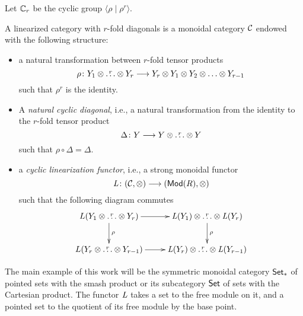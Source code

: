 Let $\mathbb{C}_r$ be the cyclic group $\langle\rho\mid \rho^r\rangle$.
\begin{definition}
	A linearized category with $r$-fold diagonals is a monoidal category $\mathcal{C}$ %
	endowed with the following structure:
	\begin{itemize}
		\item a natural transformation between $r$-fold tensor products
		\[
		\rho \colon Y_1 \ot \overset{r}{\dots} \ot Y_r \lra Y_r \ot Y_1 \ot Y_2 \ot \dots \ot Y_{r-1}
		\]
		such that $\rho^r$ is the identity.
		\item A \emph{natural cyclic diagonal}, i.e., a natural transformation from the identity to the $r$-fold tensor product
		\[
		\Delta \colon Y \longrightarrow Y \otimes \overset{r}{\dots} \otimes Y
		\]
		such that $\rho\circ \Delta = \Delta$.
		\item a \emph{cyclic linearization functor}, i.e., a %
		strong monoidal functor
		\[
		\operatorname{{\it L}} \colon (\mathcal{C}, \otimes ) \longrightarrow (\mathsf{Mod}(R), \otimes )
		\]
		such that the following diagram commutes
		\[
		\xymatrix{
			L(Y_1 \ot \overset{r}{\dots} \ot Y_r) \ar[r]\ar[d]^{\rho} & \abel(Y_1) \ot \overset{r}{\dots} \ot 	\abel(Y_r)\ar[d]^{\rho} \\
			L(Y_{r} \ot \overset{r}{\dots} \ot Y_{r-1}) \ar[r] & \abel(Y_r) \ot \overset{r}{\dots} \ot \abel(Y_{r-1}) }
		\]
	\end{itemize}
\end{definition}
The main example of this work will be the symmetric monoidal category $\mathsf{Set}_*$ of pointed sets with the smash product or its subcategory $\mathsf{Set}$ of sets with the Cartesian product. The functor $\operatorname{{\it L}}$ takes a set to the free module on it, and a pointed set to the quotient of its free module by the base point.

